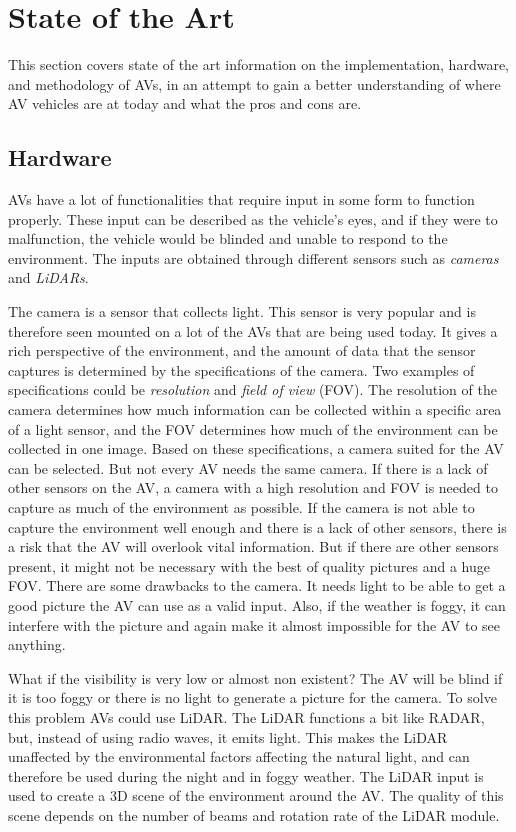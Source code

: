 \section{State of the Art}\label{sec:stateOfTheArt}
This section covers state of the art information on the implementation, hardware, and methodology of AVs, in an attempt to gain a better understanding of where AV vehicles are at today and what the pros and cons are.


\subsection{Hardware}\label{probana:state-of-the-art:hardware}
AVs have a lot of functionalities that require input in some form to function properly.
These input can be described as the vehicle's eyes, and if they were to malfunction, the vehicle would be blinded and unable to respond to the environment.
The inputs are obtained through different sensors such as \textit{cameras} and \textit{LiDARs}.

The camera is a sensor that collects light.
This sensor is very popular and is therefore seen mounted on a lot of the AVs that are being used today.
It gives a rich perspective of the environment, and the amount of data that the sensor captures is determined by the specifications of the camera.
Two examples of specifications could be \textit{resolution} and \textit{field of view} (FOV).
The resolution of the camera determines how much information can be collected within a specific area of a light sensor, and the FOV determines how much of the environment can be collected in one image.
Based on these specifications, a camera suited for the AV can be selected.
But not every AV needs the same camera.
If there is a lack of other sensors on the AV, a camera with a high resolution and FOV is needed to capture as much of the environment as possible.
If the camera is not able to capture the environment well enough and there is a lack of other sensors, there is a risk that the AV will overlook vital information.
But if there are other sensors present, it might not be necessary with the best of quality pictures and a huge FOV.
There are some drawbacks to the camera.
It needs light to be able to get a good picture the AV can use as a valid input.
Also, if the weather is foggy, it can interfere with the picture and again make it almost impossible for the AV to see anything.
\cite{university_of_toronto_self-driving_vehicle}

What if the visibility is very low or almost non existent?
The AV will be blind if it is too foggy or there is no light to generate a picture for the camera.
To solve this problem AVs could use LiDAR.
The LiDAR functions a bit like RADAR, but, instead of using radio waves, it emits light.
This makes the LiDAR unaffected by the environmental factors affecting the natural light, and can therefore be used during the night and in foggy weather.
The LiDAR input is used to create a 3D scene of the environment around the AV.
The quality of this scene depends on the number of beams and rotation rate of the LiDAR module.
\cite{university_of_toronto_self-driving_vehicle}


